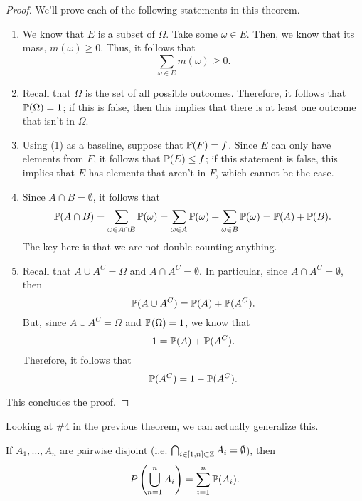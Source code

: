 \begin{proof}
    We'll prove each of the following statements in this theorem.
    \begin{enumerate}
        \item We know that $E$ is a subset of $\Omega$. Take some $\omega \in E$. Then, we know that its mass, $m(\omega) \geq 0$. Thus, it follows that 
        \[\sum_{\omega \in E} m(\omega) \geq 0.\]

        \item Recall that $\Omega$ is the set of all possible outcomes. Therefore, it follows that $\mathbb{P}(\Omega) = 1$; if this is false, then this implies that there is at least one outcome that isn't in $\Omega$. 
        
        \item Using (1) as a baseline, suppose that $\mathbb{P}(F) = f$. Since $E$ can only have elements from $F$, it follows that $\mathbb{P}(E) \leq f$; if this statement is false, this implies that $E$ has elements that aren't in $F$, which cannot be the case.
        
        \item Since $A \cap B = \emptyset$, it follows that 
        \[\mathbb{P}(A \cap B) = \sum_{\omega \in A \cap B} \mathbb{P}(\omega) = \sum_{\omega \in A} \mathbb{P}(\omega) + \sum_{\omega \in B} \mathbb{P}(\omega) = \mathbb{P}(A) + \mathbb{P}(B).\]
        The key here is that we are not double-counting anything. 

        \item Recall that $A \cup A^C = \Omega$ and $A \cap A^C = \emptyset$. In particular, since $A \cap A^C = \emptyset$, then
        \[\mathbb{P}(A \cup A^C) = \mathbb{P}(A) + \mathbb{P}(A^C).\]
        But, since $A \cup A^C = \Omega$ and $\mathbb{P}(\Omega) = 1$, we know that 
        \[1 = \mathbb{P}(A) + \mathbb{P}(A^C).\]
        Therefore, it follows that 
        \[\mathbb{P}(A^C) = 1 - \mathbb{P}(A^C).\]
    \end{enumerate}
    This concludes the proof. 
\end{proof}
Looking at \#4 in the previous theorem, we can actually generalize this. 
\begin{theorem}{}{}
    If $A_1, \dots, A_n$ are pairwise disjoint (i.e. $\bigcap_{i \in [1, n] \subset \mathbb{Z}} A_i = \emptyset$), then 
    \[P\left(\bigcup_{n = 1}^{n} A_i\right) = \sum_{i = 1}^{n} \mathbb{P}(A_i).\]
\end{theorem}

